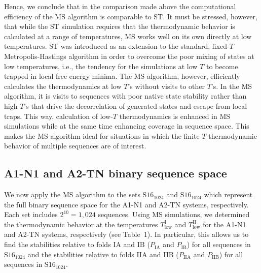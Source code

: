 \documentclass[
aip,
rsi,%
amsmath,amssymb,
reprint,%
]{revtex4-1}
\newcommand {\TlowI}     {{T^\mathrm{I}_\mathrm{low}}}
\newcommand {\TlowII}    {{T^\mathrm{II}_\mathrm{low}}}
\newcommand {\PIA}    	{{P_\mathrm{IA}}}
\newcommand {\PIB}    	{{P_\mathrm{IB}}}
\newcommand {\PIIA}    	{{P_\mathrm{IIA}}}
\newcommand {\PIIB}    	{{P_\mathrm{IIB}}}
\newcommand {\SI}		{${\mathrm{S16}_{1024}}$}
\newcommand {\SII}		{${\mathrm{S16}_{1024}}$}
\begin{document}
Hence, we conclude that in the comparison made above the computational efficiency of the MS algorithm is comparable to ST. It must be stressed, however, that while the ST simulation requires that the thermodynamic behavior is calculated at a range of temperatures, MS works well on its own directly at low temperatures. ST was introduced as an extension to the standard, fixed-$T$ Metropolis-Hastings algorithm in order to overcome the poor mixing of states at low temperatures, i.e., the tendency for the simulations at low $T$ to become trapped in local free energy minima. The MS algorithm, however, efficiently calculates the thermodynamics at low $T$'s without visits to other $T$'s. In the MS algorithm, it is visits to sequences with poor native state stability rather than high $T$'s that drive the decorrelation of generated states and escape from local traps. This way, calculation of low-$T$ thermodynamics is enhanced in MS simulations while at the same time enhancing coverage in sequence space. This makes the MS algorithm ideal for situations in which the finite-$T$ thermodynamic behavior of multiple sequences are of interest. 

\vspace{12pt}
\subsection{A1-N1 and A2-TN binary sequence space}
\noindent

We now apply the MS algorithm to the sets {\SI} and {\SII} which represent the full binary sequence space for the A1-N1 and A2-TN systems, respectively. Each set includes $2^{10}=1,024$ sequences. Using MS simulations, we determined the thermodynamic behavior at the temperatures $\TlowI$ and $\TlowII$ for the A1-N1 and A2-TN systems, respectively (see Table~1). In particular, this allows us to find the stabilities relative to folds IA and IB ($\PIA$ and $\PIB$) for all sequences in {\SI} and the stabilities relative to folds IIA and IIB ($\PIIA$ and $\PIIB$) for all sequences in {\SII}.
\end{document}
